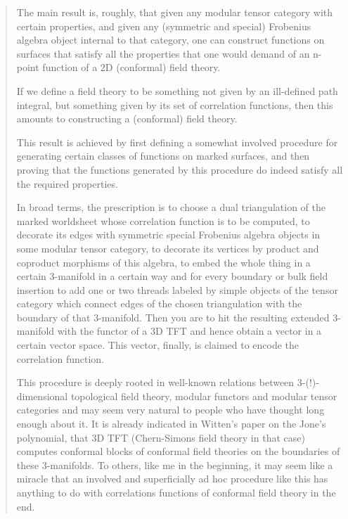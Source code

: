 \begin{quote}
The main result is, roughly, that given any modular tensor
category with certain properties, and given any
(symmetric and special) Frobenius algebra object internal
to that category, one can construct functions on surfaces
that satisfy all the properties that one would demand of
an n-point function of a 2D (conformal) field theory.

If we define a field theory to be something not given by
an ill-defined path integral, but something given by
its set of correlation functions, then this amounts to
constructing a (conformal) field theory.

This result is achieved by first defining a somewhat
involved procedure for generating certain classes of
functions on marked surfaces, and then proving that
the functions generated by this procedure do indeed
satisfy all the required properties.

In broad terms, the prescription is to choose a dual
triangulation of the marked worldsheet whose correlation
function is to be computed, to decorate its edges with
symmetric special Frobenius algebra objects in some
modular tensor category, to decorate its vertices by
product and coproduct morphisms of this algebra, to
embed the whole thing in a certain 3-manifold in a
certain way and for every boundary or bulk field
insertion to add one or two threads labeled by
simple objects of the tensor category which connect
edges of the chosen triangulation with the boundary of
that 3-manifold. Then you are to hit the resulting
extended 3-manifold with the functor of a 3D TFT and
hence obtain a vector in a certain vector space. This
vector, finally, is claimed to encode the correlation
function.

This procedure is deeply rooted in well-known relations
between 3-(!)-dimensional topological field theory,
modular functors and modular tensor categories and
may seem very natural to people who have thought long
enough about it. It is already indicated in Witten's
paper on the Jone's polynomial, that 3D TFT (Chern-Simons
field theory in that case) computes conformal blocks
of conformal field theories on the boundaries of these
3-manifolds. To others, like me in the beginning,
it may seem like a miracle that an involved and
superficially ad hoc procedure like this has anything
to do with correlations functions of conformal
field theory in the end.


\end{quote}
